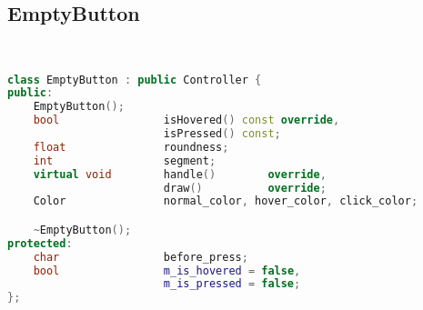 \subsection{EmptyButton}
\begin{lstlisting}[language=C++]


class EmptyButton : public Controller {
public:
    EmptyButton();
    bool                isHovered() const override,
                        isPressed() const;
    float               roundness;
    int                 segment;
    virtual void        handle()        override,
                        draw()          override;
    Color               normal_color, hover_color, click_color;

    ~EmptyButton();
protected:
    char                before_press;
    bool                m_is_hovered = false,
                        m_is_pressed = false;
};






\end{lstlisting}
